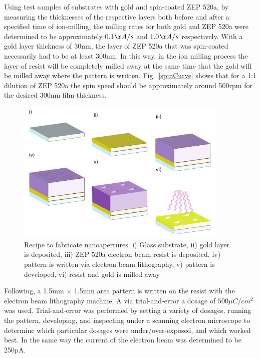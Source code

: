 Using test samples of substrates with gold and spin-coated ZEP 520a, by measuring the thicknesses of the respective layers both before and after a specified time of ion-milling, the milling rates for both gold and ZEP 520a were determined to be approximately 0.1$\AA/s$ and 1.0$\AA/s$ respectively. With a gold layer thickness of 30nm, the layer of ZEP 520a that was spin-coated necessarily had to be at least 300nm. In this way, in the ion milling process the layer of resist will be completely milled away at the same time that the gold will be milled away where the pattern is written. Fig.~\ref{spinCurve} shows that for a 1:1 dilution of ZEP 520a the spin speed should be approximately around 500rpm for the desired 300nm film thickness.
\begin{figure}[h!]
\centering
\includegraphics[width=0.9\textwidth]{NanoApertureRecipeRods.pdf}
\caption{Recipe to fabricate nanoapertures. i) Glass substrate, ii) gold layer is deposited, iii) ZEP 520a electron beam resist is deposited, iv) pattern is written via electron beam lithography, v) pattern is developed, vi) resist and gold is milled away}
\label{NanoApertureRecipe}
\end{figure}

Following, a 1.5mm $\times$ 1.5mm area pattern is written on the resist with the electron beam lithography machine. A via trial-and-error a dosage of $500\mu C/cm^2$ was used. Trial-and-error was performed by setting a variety of dosages, running the pattern, developing, and inspecting under a scanning electron microscope to determine which particular dosages were under/over-exposed, and which worked best. In the same way the current of the electron beam was determined to be 250pA.%

